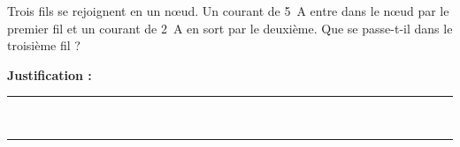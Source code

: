 Trois fils se rejoignent en un nœud. Un courant de \qty{5}{A} entre dans le nœud par le premier fil et un courant de \qty{2}{A} en sort par le deuxième. Que se passe-t-il dans le troisième fil ?

\choices

\noindent\textbf{Justification :} \hrulefill \\[2.5ex]
\rule{\linewidth}{0.4pt} \\[2.5ex]
\rule{\linewidth}{0.4pt}
\vfill
